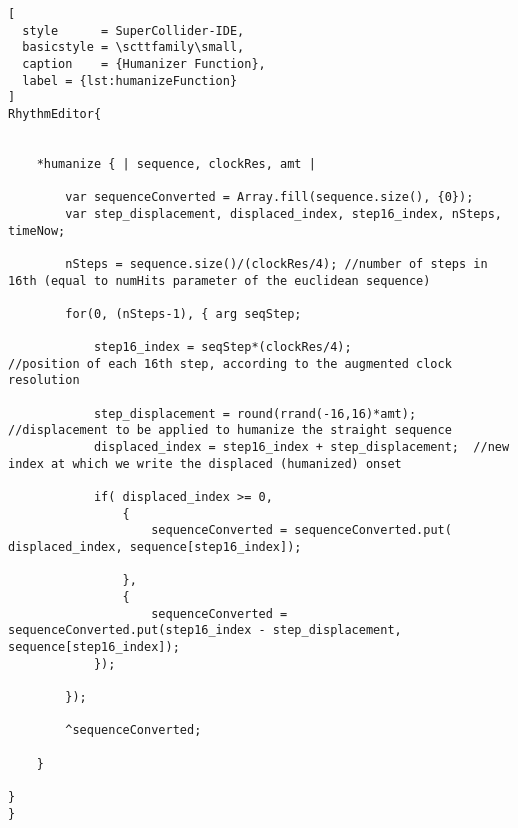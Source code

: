 \documentclass[main.tex]{subfiles}
\begin{document}
\begin{lstlisting}[
  style      = SuperCollider-IDE,
  basicstyle = \scttfamily\small,
  caption    = {Humanizer Function},
  label = {lst:humanizeFunction}
]
RhythmEditor{


	*humanize { | sequence, clockRes, amt |

		var sequenceConverted = Array.fill(sequence.size(), {0});
	    var step_displacement, displaced_index, step16_index, nSteps, timeNow;

		nSteps = sequence.size()/(clockRes/4); //number of steps in 16th (equal to numHits parameter of the euclidean sequence)

		for(0, (nSteps-1), { arg seqStep;

			step16_index = seqStep*(clockRes/4);                 //position of each 16th step, according to the augmented clock resolution

			step_displacement = round(rrand(-16,16)*amt);        //displacement to be applied to humanize the straight sequence
			displaced_index = step16_index + step_displacement;  //new index at which we write the displaced (humanized) onset

			if( displaced_index >= 0,
				{
					sequenceConverted = sequenceConverted.put( displaced_index, sequence[step16_index]);

				},
				{
					sequenceConverted = sequenceConverted.put(step16_index - step_displacement, sequence[step16_index]);
			});

		});

		^sequenceConverted;

	}

}
}
\end{lstlisting} 
\end{document}
